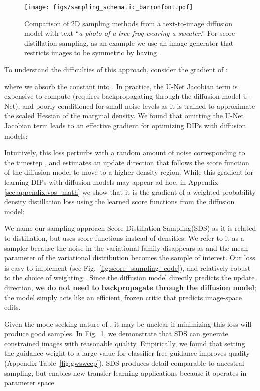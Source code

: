 \documentclass{article} \usepackage{iclr2023_conference,times}
\newcommand{\sname}{Score Distillation Sampling\xspace}
\newcommand{\sacc}{SDS\xspace}
\begin{document}
\begin{figure}[t]
    \centering
    \texttt{[image: figs/sampling\_schematic\_barronfont.pdf]}
    \vspace{-7mm}
    \caption{Comparison of 2D sampling methods from a text-to-image diffusion model with text ``{\small\em a photo of a tree frog wearing a sweater}.'' For score distillation sampling, as an example we use an image generator that restricts images to be symmetric by having .}
    \label{fig:image_schematic}
\end{figure}


To understand the difficulties of this approach, consider the gradient of :

where we absorb the constant  into . In practice, the U-Net Jacobian term is expensive to compute (requires backpropagating through the diffusion model U-Net), and poorly conditioned for small noise levels as it is trained to approximate the scaled Hessian of the marginal density. 
We found that omitting the U-Net Jacobian term leads to an effective gradient for optimizing DIPs with diffusion models:

Intuitively, this loss perturbs  with a random amount of noise corresponding to the timestep , and estimates an update direction that follows the score function of the diffusion model to move to a higher density region. While this gradient for learning DIPs with diffusion models may appear ad hoc, in Appendix \ref{sec:appendix:vos_math} we show that it is the gradient of a weighted probability density distillation loss \citep{Oord2018ParallelWF} using the learned score functions from the diffusion model:

We name our sampling approach \sname (\sacc) as it is related to distillation, but uses score functions instead of densities. We refer to it as a sampler because the noise in the variational family  disappears as  and the mean parameter of the variational distribution  becomes the sample of interest.  
Our loss is easy to implement (see Fig.~\ref{fig:score_sampling_code}), and relatively robust to the choice of weighting . Since the diffusion model directly predicts the update direction, \textbf{we do not need to backpropagate through the diffusion model}; the model simply acts like an efficient, frozen critic that predicts image-space edits. 









Given the mode-seeking nature of , it may be unclear if minimizing this loss will produce good samples. In Fig.~\ref{fig:image_schematic}, we demonstrate that \sacc can generate constrained images with reasonable quality. Empirically, we found that setting the guidance weight  to a large value for classifier-free guidance improves quality (Appendix Table~\ref{fig:gwsweep}). \sacc produces detail comparable to ancestral sampling, but enables new transfer learning applications because it operates in parameter space.
\end{document}
